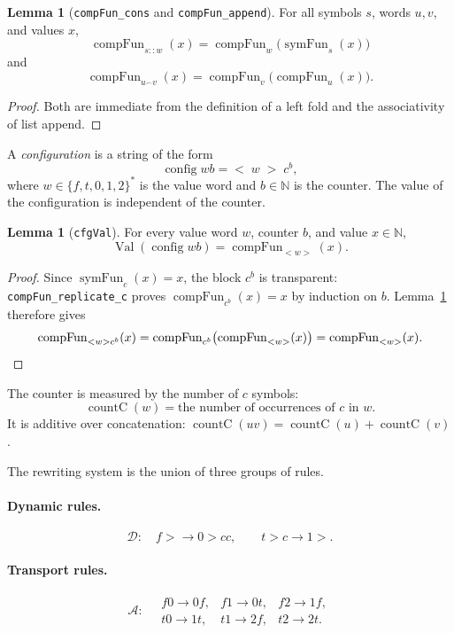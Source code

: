 \documentclass[11pt,a4paper]{article}
\theoremstyle{definition}
\newtheorem{lemma}[definition]{Lemma}
\newcommand{\lt}{<}
\newcommand{\gt}{>}
\newcommand{\Nat}{\mathbb{N}}
\newcommand{\val}{\operatorname{Val}}
\newcommand{\conc}{{^\frown}}
\newcommand{\symfun}{\operatorname{symFun}}
\newcommand{\compFun}{\operatorname{compFun}}
\newcommand{\config}{\operatorname{config}}
\newcommand{\countC}{\operatorname{countC}}
\newcommand{\auxA}{\mathcal{A}}
\newcommand{\dynRules}{\mathcal{D}}
\begin{document}
\begin{lemma}[\texttt{compFun\_cons} and \texttt{compFun\_append}]
  \label{lem:compfun-props}
  For all symbols $s$, words $u,v$, and values $x$,
  \[
    \compFun_{s::w}(x)=\compFun_w\bigl(\symfun_s(x)\bigr)
  \]
  and
  \[
    \compFun_{u\conc v}(x)=\compFun_v\bigl(\compFun_u(x)\bigr).
  \]
\end{lemma}
\begin{proof}
  Both are immediate from the definition of a left fold and the
  associativity of list append.
\end{proof}

A \emph{configuration} is a string of the form
\begin{equation}
  \label{eq:lean-config}
  \config w b
  =
  \lt\;w\;\gt\;c^{b},
\end{equation}
where $w\in\{f,t,0,1,2\}^{*}$ is the value word and $b\in\Nat$ is the
counter.  The value of the configuration is independent of the counter.

\begin{lemma}[\texttt{cfgVal}]
  \label{lem:cfg-val}
  For every value word $w$, counter $b$, and value $x\in\Nat$,
  \[
    \val(\config w b)=\compFun_{\lt w\gt}(x).
  \]
\end{lemma}
\begin{proof}
  Since $\symfun_c(x)=x$, the block $c^{b}$ is transparent:
  \texttt{compFun\_replicate\_c} proves $\compFun_{c^{b}}(x)=x$ by
  induction on $b$.  Lemma~\ref{lem:compfun-props} therefore gives
  \[
    \compFun_{\lt w\gt c^{b}}(x)
    =\compFun_{c^{b}}\bigl(\compFun_{\lt w\gt}(x)\bigr)
    =\compFun_{\lt w\gt}(x).\qedhere
  \]
\end{proof}

The counter is measured by the number of $c$ symbols:
\[
  \countC(w)=\text{the number of occurrences of }c\text{ in }w.
\]
It is additive over concatenation: $\countC(uv)=\countC(u)+\countC(v)$.

The rewriting system is the union of three groups of rules.

\paragraph{Dynamic rules.}
\begin{equation}
  \label{eq:lean-dyn}
  \dynRules:\quad
  f\gt\to 0\gt cc,
  \qquad
  t\gt c\to 1\gt.
\end{equation}

\paragraph{Transport rules.}
\begin{equation}
  \label{eq:lean-transport}
  \auxA:\quad
  \begin{array}{lll}
    f0\to 0f, & f1\to 0t, & f2\to 1f, \\
    t0\to 1t, & t1\to 2f, & t2\to 2t.
  \end{array}
\end{equation}
\end{document}
